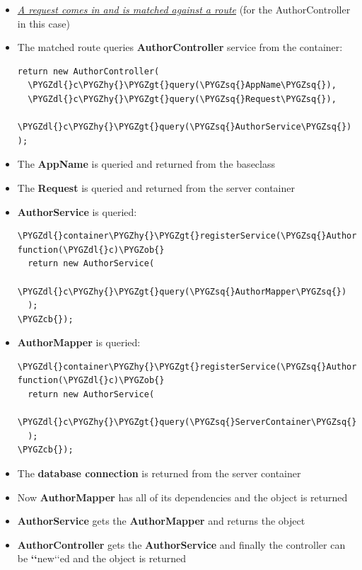 \documentclass[letterpaper,10pt,english]{sphinxmanual}
\def\PYGZob{\char`\{}
\def\PYGZcb{\char`\}}
\def\PYGZgt{\char`\>}
\def\PYGZdl{\char`\$}
\def\PYGZhy{\char`\-}
\def\PYGZsq{\char`\'}
\begin{document}
\begin{itemize}
\item {} 
{\hyperref[app/request::doc]{\emph{A request comes in and is matched against a route}}} (for the AuthorController in this case)

\item {} 
The matched route queries \textbf{AuthorController} service from the container:

\begin{Verbatim}[commandchars=\\\{\}]
return new AuthorController(
  \PYGZdl{}c\PYGZhy{}\PYGZgt{}query(\PYGZsq{}AppName\PYGZsq{}),
  \PYGZdl{}c\PYGZhy{}\PYGZgt{}query(\PYGZsq{}Request\PYGZsq{}),
  \PYGZdl{}c\PYGZhy{}\PYGZgt{}query(\PYGZsq{}AuthorService\PYGZsq{})
);
\end{Verbatim}

\item {} 
The \textbf{AppName} is queried and returned from the baseclass

\item {} 
The \textbf{Request} is queried and returned from the server container

\item {} 
\textbf{AuthorService} is queried:

\begin{Verbatim}[commandchars=\\\{\}]
\PYGZdl{}container\PYGZhy{}\PYGZgt{}registerService(\PYGZsq{}AuthorService\PYGZsq{}, function(\PYGZdl{}c)\PYGZob{}
  return new AuthorService(
    \PYGZdl{}c\PYGZhy{}\PYGZgt{}query(\PYGZsq{}AuthorMapper\PYGZsq{})
  );
\PYGZcb{});
\end{Verbatim}

\item {} 
\textbf{AuthorMapper} is queried:

\begin{Verbatim}[commandchars=\\\{\}]
\PYGZdl{}container\PYGZhy{}\PYGZgt{}registerService(\PYGZsq{}AuthorMappers\PYGZsq{}, function(\PYGZdl{}c)\PYGZob{}
  return new AuthorService(
    \PYGZdl{}c\PYGZhy{}\PYGZgt{}query(\PYGZsq{}ServerContainer\PYGZsq{})\PYGZhy{}\PYGZgt{}getDb()
  );
\PYGZcb{});
\end{Verbatim}

\item {} 
The \textbf{database connection} is returned from the server container

\item {} 
Now \textbf{AuthorMapper} has all of its dependencies and the object is returned

\item {} 
\textbf{AuthorService} gets the \textbf{AuthorMapper} and returns the object

\item {} 
\textbf{AuthorController} gets the \textbf{AuthorService} and finally the controller can be {\color{red}\bfseries{}{}`{}`}new{}`{}`ed and the object is returned

\end{itemize}
\end{document}
